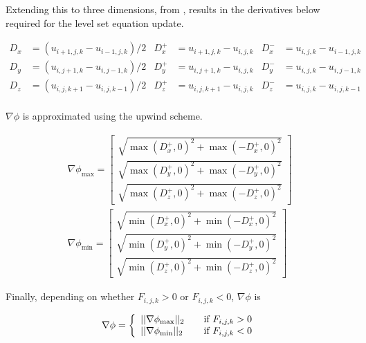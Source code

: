 Extending this to three dimensions, from \cite{Lefohn04astreaming}, results in the derivatives below required for the level set equation update. 

\begin{spacing}{1.1}
\begin{align}
	D_x &= (u_{i+1,j,k}-u_{i-1,j,k})/2 & D_x^+ &= u_{i+1,j,k}-u_{i,j,k} & D_x^- &= u_{i,j,k}-u_{i-1,j,k} \nonumber\\
	D_y &= (u_{i,j+1,k}-u_{i,j-1,k})/2 & D_y^+ &= u_{i,j+1,k}-u_{i,j,k} &	D_y^- &= u_{i,j,k}-u_{i,j-1,k} \nonumber\\
	D_z &= (u_{i,j,k+1}-u_{i,j,k-1})/2 & D_z^+ &= u_{i,j,k+1}-u_{i,j,k} &	D_z^- &= u_{i,j,k}-u_{i,j,k-1} \nonumber\\
\end{align}


$\nabla\phi$ is approximated using the upwind scheme.
\end{spacing}

\begin{align}
\nabla\phi_{\max} = \left[
  \begin{array}{ c }
     \sqrt{\max(D_x^+, 0)^2 + \max(-D_x^+,0)^2}  \\[2em]
     \sqrt{\max(D_y^+, 0)^2 + \max(-D_y^+,0)^2}  \\[2em]
     \sqrt{\max(D_z^+, 0)^2 + \max(-D_z^+,0)^2}  
  \end{array} \right]
\\[2em]
\nabla\phi_{\min} = \left[
  \begin{array}{ c }
     \sqrt{\min(D_x^+, 0)^2 + \min(-D_x^+,0)^2}  \\[2em]
     \sqrt{\min(D_y^+, 0)^2 + \min(-D_y^+,0)^2}  \\[2em]
     \sqrt{\min(D_z^+, 0)^2 + \min(-D_z^+,0)^2} 
  \end{array} \right]
\end{align}

Finally, depending on whether $F_{i,j,k} > 0$ or $F_{i,j,k} < 0$, $\nabla\phi$ is 

\begin{equation}
\nabla\phi = \left\{ 
\begin{array}{l l}
  ||\nabla\phi_{\max}||_2 & \quad \mbox{if $F_{i,j,k} > 0$}\\
  ||\nabla\phi_{\min}||_2 & \quad \mbox{if $F_{i,j,k} < 0$}\\ \end{array} \right.
\label{eq:finalchoice}
\end{equation}

